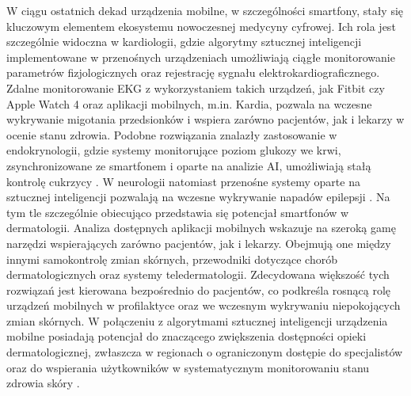 W ciągu ostatnich dekad urządzenia mobilne, w szczególności smartfony, stały się kluczowym elementem ekosystemu nowoczesnej medycyny cyfrowej.
Ich rola jest szczególnie widoczna w kardiologii, gdzie algorytmy sztucznej inteligencji implementowane w przenośnych urządzeniach umożliwiają ciągłe monitorowanie parametrów fizjologicznych oraz rejestrację sygnału elektrokardiograficznego. 
Zdalne monitorowanie EKG z wykorzystaniem takich urządzeń, jak Fitbit czy Apple Watch 4 oraz aplikacji mobilnych, m.in. Kardia, pozwala na wczesne wykrywanie migotania przedsionków i wspiera zarówno pacjentów, jak i lekarzy w ocenie stanu zdrowia.
Podobne rozwiązania znalazły zastosowanie w endokrynologii, gdzie systemy monitorujące poziom glukozy we krwi, zsynchronizowane ze smartfonem i oparte na analizie AI, umożliwiają stałą kontrolę cukrzycy \cite{amisha_overview_2019, briganti_artificial_2020, halcox_assessment_2017}.
W neurologii natomiast przenośne systemy oparte na sztucznej inteligencji pozwalają na wczesne wykrywanie napadów epilepsji \cite{briganti_artificial_2020}.
Na tym tle szczególnie obiecująco przedstawia się potencjał smartfonów w dermatologii.
Analiza dostępnych aplikacji mobilnych wskazuje na szeroką gamę narzędzi wspierających zarówno pacjentów, jak i lekarzy.
Obejmują one między innymi samokontrolę zmian skórnych, przewodniki dotyczące chorób dermatologicznych oraz systemy teledermatologii.
Zdecydowana większość tych rozwiązań jest kierowana bezpośrednio do pacjentów, co podkreśla rosnącą rolę urządzeń mobilnych w profilaktyce oraz we wczesnym wykrywaniu niepokojących zmian skórnych.
W połączeniu z algorytmami sztucznej inteligencji urządzenia mobilne posiadają potencjał do znaczącego zwiększenia dostępności opieki dermatologicznej, zwłaszcza w regionach o ograniczonym dostępie do specjalistów oraz do wspierania użytkowników w systematycznym monitorowaniu stanu zdrowia skóry \cite{jamadermatol, Binder_2013, Janda_2021}.


